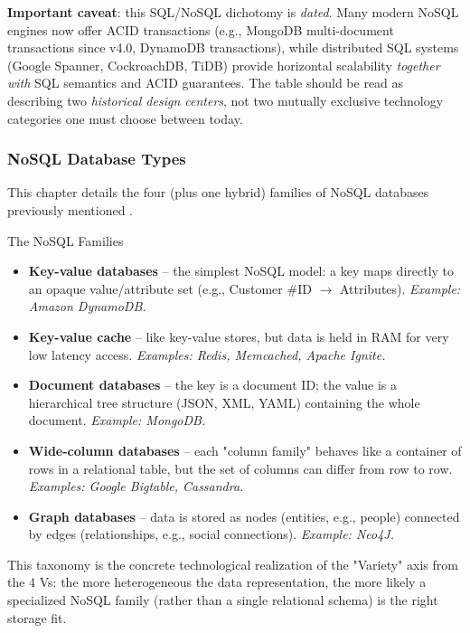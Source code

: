 \textbf{Important caveat}: this SQL/NoSQL dichotomy is \emph{dated}. Many modern NoSQL engines now offer ACID transactions (e.g., MongoDB multi-document transactions since v4.0, DynamoDB transactions), while distributed SQL systems (Google Spanner, CockroachDB, TiDB) provide horizontal scalability \emph{together with} SQL semantics and ACID guarantees. The table should be read as describing two \emph{historical design centers}, not two mutually exclusive technology categories one must choose between today.

\subsubsection{NoSQL Database Types}

This chapter details the four (plus one hybrid) families of NoSQL databases previously mentioned .

\begin{defbox}{The NoSQL Families}
\begin{itemize}
    \item \textbf{Key-value databases} -- the simplest NoSQL model: a key maps directly to an opaque value/attribute set (e.g., Customer \#ID $\rightarrow$ Attributes). \emph{Example: Amazon DynamoDB.}
    \vspace{0.2cm}
    \item \textbf{Key-value cache} -- like key-value stores, but data is held in RAM for very low latency access. \emph{Examples: Redis, Memcached, Apache Ignite.}
    \vspace{0.2cm}
    \item \textbf{Document databases} -- the key is a document ID; the value is a hierarchical tree structure (JSON, XML, YAML) containing the whole document. \emph{Example: MongoDB.}
    \vspace{0.2cm}
    \item \textbf{Wide-column databases} -- each "column family" behaves like a container of rows in a relational table, but the set of columns can differ from row to row. \emph{Examples: Google Bigtable, Cassandra.}
    \vspace{0.2cm}
    \item \textbf{Graph databases} -- data is stored as nodes (entities, e.g., people) connected by edges (relationships, e.g., social connections). \emph{Example: Neo4J.}
\end{itemize}
\end{defbox}

 This taxonomy is the concrete technological realization of the "Variety" axis from the 4 Vs: the more heterogeneous the data representation, the more likely a specialized NoSQL family (rather than a single relational schema) is the right storage fit.


